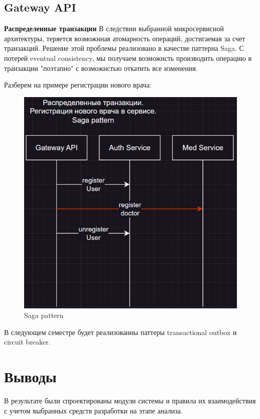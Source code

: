 \subsection{Gateway API}

\textbf{Распределенные транзакции}
В следствии выбранной микросервисной архитектуры, теряется возможнная атомарность операций, достигаемая
за счет транзакций. Решение этой проблемы реализовано в качестве паттерна Saga. 
С потерей eventual consistency, мы получаем возможнсть производить операцию в транзакции "поэтапно" с возможнстью
откатить все изменения. 

Разберем на примере регистрации нового врача:
\begin{figure}[H]%
	\begin{center}
		\includegraphics[width=.7\columnwidth]{./img/saga_pattern.png}%
	\end{center}
	\caption{Saga pattern}%
	\label{pic:auth_model}%
\end{figure}


В следующем семестре будет реализованны паттеры transactional outbox и circuit breaker.


\section{Выводы}

В результате были спроектированы модули системы и правила их взаимодействия с учетом выбранных средств разработки
на этапе анализа.


